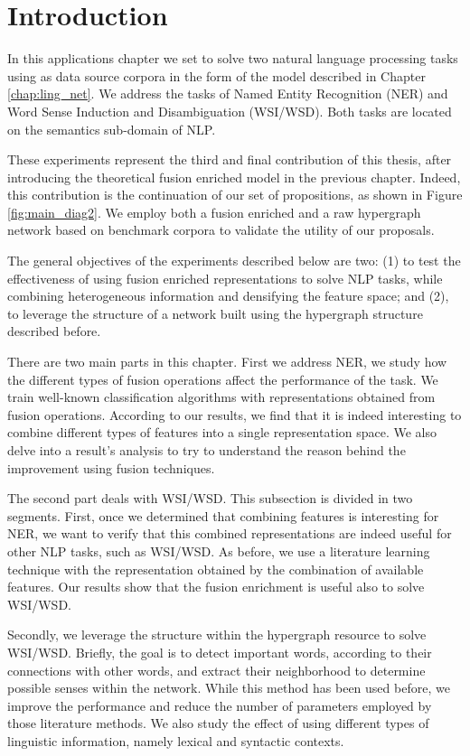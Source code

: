 \minitoc
\section{Introduction}
In this applications chapter we set to solve two natural language processing tasks using as data source corpora in the form of the model described in Chapter \ref{chap:ling_net}. We address the tasks of Named Entity Recognition (NER) and Word Sense Induction and Disambiguation (WSI/WSD). Both tasks are located on the  semantics sub-domain of NLP. 

These experiments represent the third and final contribution of this thesis, after introducing the theoretical fusion enriched model in the previous chapter. Indeed, this contribution is the continuation of our set of propositions, as shown in Figure \ref{fig:main_diag2}. We employ both a fusion enriched and a raw hypergraph network based on benchmark corpora to validate the utility of our proposals.

The general objectives of the experiments described below are two: (1) to test the effectiveness of using fusion enriched representations to solve NLP tasks, while combining heterogeneous information and densifying the feature space;  and (2), to leverage the structure of a network built using the hypergraph structure described before.

There are two main parts  in this chapter. First we address NER, we study how the different types of fusion operations affect the performance of the task. We train well-known classification algorithms with representations obtained from fusion operations.  According to our results, we find that it is indeed interesting to combine different types of features into a single representation space. We also delve into a result's analysis to try to understand the reason behind the improvement using fusion techniques.

The second part deals with WSI/WSD. This subsection is divided in two segments. First, once we determined that combining features is interesting for NER, we want to verify that this combined representations are indeed useful for other NLP tasks, such as WSI/WSD. As before, we use a literature learning technique with the representation obtained by the combination of available features. Our results show that the fusion enrichment is useful also to solve WSI/WSD.

Secondly, we leverage the structure within the hypergraph resource to solve WSI/WSD. Briefly, the goal is to detect important words, according to their connections with other words, and extract their neighborhood to determine possible senses  within the network. While this method has been used before, we improve the performance and reduce the number of parameters employed by those literature methods. We also study the effect of using different types of linguistic information, namely lexical and syntactic contexts.

